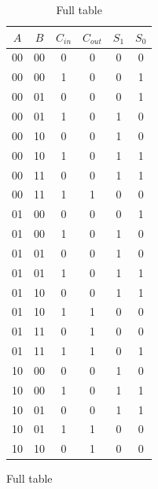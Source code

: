 \documentclass[12pt]{article}
\begin{document}
\begin{table}[H]
    \centering
    \begin{subfigure}{0.4\linewidth}
        \caption{Full table}
        \label{tab:truth-table-mux}
        \begin{tabular}{c c c | c c c}
            \toprule
            $A$ & $B$ & $C_{in}$ & $C_{out}$ & $S_1$ & $S_0$ \\
            \midrule
            00  & 00  & 0        & 0         & 0     & 0     \\
            00  & 00  & 1        & 0         & 0     & 1     \\
            00  & 01  & 0        & 0         & 0     & 1     \\
            00  & 01  & 1        & 0         & 1     & 0     \\
            00  & 10  & 0        & 0         & 1     & 0     \\
            00  & 10  & 1        & 0         & 1     & 1     \\
            00  & 11  & 0        & 0         & 1     & 1     \\
            00  & 11  & 1        & 1         & 0     & 0     \\
            01  & 00  & 0        & 0         & 0     & 1     \\
            01  & 00  & 1        & 0         & 1     & 0     \\
            01  & 01  & 0        & 0         & 1     & 0     \\
            01  & 01  & 1        & 0         & 1     & 1     \\
            01  & 10  & 0        & 0         & 1     & 1     \\
            01  & 10  & 1        & 1         & 0     & 0     \\
            01  & 11  & 0        & 1         & 0     & 0     \\
            01  & 11  & 1        & 1         & 0     & 1     \\
            10  & 00  & 0        & 0         & 1     & 0     \\
            10  & 00  & 1        & 0         & 1     & 1     \\
            10  & 01  & 0        & 0         & 1     & 1     \\
            10  & 01  & 1        & 1         & 0     & 0     \\
            10  & 10  & 0        & 1         & 0     & 0     \\

\end{tabular}
\end{subfigure}
\end{table}
\end{document}
